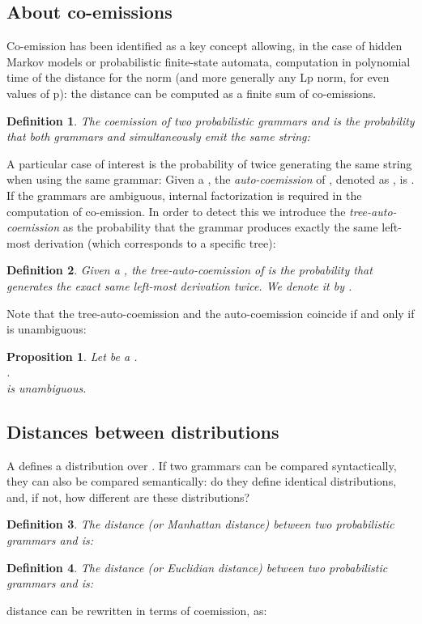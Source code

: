 \documentclass[submission]{eptcs} \usepackage{breakurl}             \usepackage[english]{babel}
\newtheorem{definition}{Definition}
\newtheorem{proposition}{Proposition}
\begin{document}
\subsection{About co-emissions} 

Co-emission has been identified as a key concept allowing, in the case of hidden Markov models or probabilistic finite-state automata, computation in polynomial time of the distance for the  norm (and more generally any Lp norm, for even values of p): the distance can be computed as a finite sum of co-emissions.
\begin{definition}
The coemission of two probabilistic grammars  and  is the probability that both grammars  and  simultaneously emit the same string:\\

\end{definition}
A particular case of interest is the probability of twice generating the same string when using the same grammar:
Given a  , the \emph{auto-coemission} of , denoted as , is . 
If the grammars are ambiguous, internal factorization is required in the computation of co-emission. In order to detect this we introduce the \emph{tree-auto-coemission} as the probability that the grammar produces exactly the same left-most derivation (which corresponds to a specific tree):
\begin{definition}
Given a  , the \emph{tree-auto-coemission} of  is the probability that  generates the exact same left-most derivation twice. We denote it by .
\end{definition}
Note that the tree-auto-coemission and the auto-coemission coincide if and only if  is unambiguous:
\begin{proposition}\label{ambiguity}
Let  be a .\\
.\\
  is unambiguous.
\end{proposition}


\subsection{Distances between distributions}
A  defines a distribution over . If two grammars can be compared syntactically, they can also be compared semantically: do they define identical distributions, and, if not, how different are these distributions?
\begin{definition}
The  distance (or Manhattan distance) between two probabilistic grammars  and  is:

\end{definition}
\begin{definition}
The  distance (or Euclidian distance) between two probabilistic grammars  and  is:

\end{definition}
 distance can be rewritten in terms of coemission, as:
\end{document}
